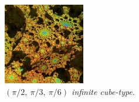\begin{figure}[h!tbp]
\begin{minipage}[t]{0.5\textwidth}
  \begin{minipage}[t]{0.24\textwidth}
  \centering
  \includegraphics[width=1.4in, height=1.4in, keepaspectratio]
   {./img/application/sphairahedron/variations/cube/limitType3.jpg}
  \end{minipage}
  \hspace*{\fill}
 \caption{\textit{$(\pi/2,~\pi/3,~\pi/6)$ infinite cube-type.}}
 \label{fig:cube-236}
 \end{minipage}
\end{figure}

